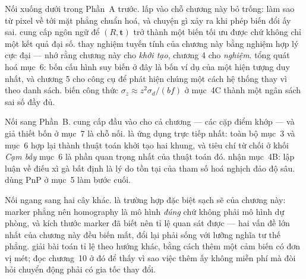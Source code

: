 \documentclass[../../vslam.tex]{subfiles}
\begin{document}
Nối xuống dưới trong Phần~A trước.  lấp vào chỗ chương này bỏ trống: làm sao từ pixel về tới mặt phẳng chuẩn hoá, và chuyện gì xảy ra khi phép biến đổi ấy sai.  cung cấp ngôn ngữ để \((R,\mathbf{t})\) trở thành một biến tối ưu được chứ không chỉ một kết quả đại số.  thay nghiệm tuyến tính của chương này bằng nghiệm hợp lý cực đại --- nhớ rằng chương này cho \emph{khởi tạo}, chương 4 cho \emph{nghiệm}.  tổng quát hoá mục~6: bốn cấu hình suy biến ở đây là bốn ví dụ của một hiện tượng duy nhất, và chương 5 cho công cụ để phát hiện chúng một cách hệ thống thay vì theo danh sách.  biến công thức \(\sigma_z \approx z^2 \sigma_d/(bf)\) ở mục~4C thành một ngân sách sai số đầy đủ.

Nối sang Phần~B.  cung cấp đầu vào cho cả chương --- các cặp điểm khớp --- và giả thiết bốn ở mục~7 là chỗ nối.  là ứng dụng trực tiếp nhất: toàn bộ mục~3 và mục~6 hợp lại thành thuật toán khởi tạo hai khung, và tiêu chí từ chối ở khối \emph{Cạm bẫy} mục~6 là phần quan trọng nhất của thuật toán đó.  nhận mục~4B: lập luận về điếu xì gà bất định là lý do tồn tại của tham số hoá nghịch đảo độ sâu.  dùng PnP ở mục~5 làm bước cuối.

Nối ngang sang hai cây khác.  là trường hợp đặc biệt sạch sẽ của chương này: marker phẳng nên homography là mô hình \emph{đúng} chứ không phải mô hình dự phòng, và kích thước marker đã biết nên tỉ lệ quan sát được --- hai vấn đề lớn nhất của chương này đều biến mất, đổi lại phải sống với lưỡng nghĩa tư thế phẳng.  giải bài toán tỉ lệ theo hướng khác, bằng cách thêm một cảm biến có đơn vị mét; đọc chương~10 ở đó để thấy vì sao việc thêm ấy không miễn phí mà đòi hỏi chuyển động phải có gia tốc thay đổi.
\end{document}
